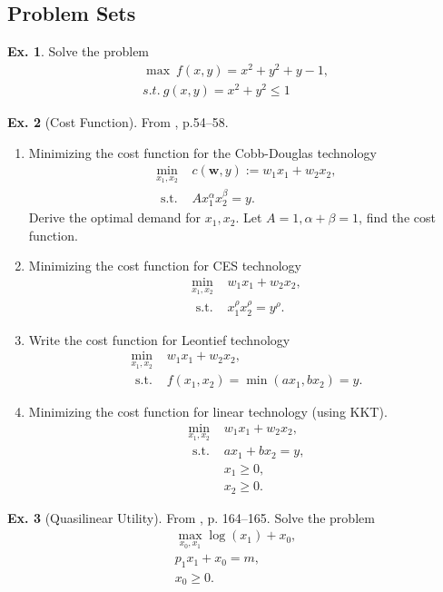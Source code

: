 \documentclass[11pt,a4paper]{book}
\theoremstyle{definition}\newtheorem{definition}{Definition}
\theoremstyle{definition}\newtheorem{fact}{Fact}
\theoremstyle{definition}\newtheorem{remark}{Remark}
\theoremstyle{definition}\newtheorem{ex}{Ex.}
\theoremstyle{definition}\newtheorem{project}{Project}
\theoremstyle{definition}\newtheorem{problem}{Problem}
\theoremstyle{definition}\newtheorem{example}{Example}
\numberwithin{theorem}{section}
\numberwithin{corollary}{chapter}
\numberwithin{assumption}{chapter}
\numberwithin{definition}{chapter}
\numberwithin{prop}{chapter}
\numberwithin{notation}{chapter}
\numberwithin{problem}{chapter}
\numberwithin{example}{chapter}
\numberwithin{fact}{chapter}
\numberwithin{ex}{chapter}
\def\w{\mathbf w}
\begin{document}
	\subsection{Problem Sets}
	\begin{ex}
		Solve the problem
		\begin{align*}
			&\max  \  f(x,y) = x^2 + y^2 + y - 1, \\
			&s.t. \ g(x,y) = x^2 + y^2 \leq 1 &                             
		\end{align*}
	\end{ex}
	
		\begin{ex}[Cost Function]
		From \citet{varian1992microeconomic}, p.54--58. 
		\begin{enumerate}
			\item Minimizing the cost function for the Cobb-Douglas technology
			\begin{align*}
				\min_{x_1, x_2} &c(\w, y):= w_1 x_1 + w_2 x_2, \\
				\text{ s.t. } &A x_1^\alpha x_2^\beta = y.
			\end{align*}
			Derive the optimal demand for $x_1, x_2$. Let $A=1, \alpha+\beta=1$, find the cost function.
			\item Minimizing the cost function for CES technology
			\begin{align*}
				\min_{x_1, x_2} & w_1 x_1 + w_2 x_2, \\
				\text{ s.t. } & x_1^\rho x_2^\rho = y^\rho.
			\end{align*}
			\item Write the cost function for Leontief technology
			\begin{align*}
				\min_{x_1, x_2} & w_1 x_1 + w_2 x_2, \\
				\text{ s.t. } & f(x_1,x_2) = \min (ax_1, bx_2) = y.
			\end{align*}
			\item Minimizing the cost function for linear technology (using KKT). 
			\begin{align*}
				\min_{x_1, x_2} & w_1 x_1 + w_2 x_2, \\
				\text{ s.t. } & a x_1 + b x_2 = y, \\
				& x_1 \geq 0, \\
				& x_2 \geq 0.
			\end{align*}
		\end{enumerate} 
	\end{ex}
	
	\begin{ex}[Quasilinear Utility]
		From \citet{varian1992microeconomic}, p. 164--165. Solve the problem
		\begin{align*}
			\max_{x_0, x_1} \log(x_1) + x_0, \\
			p_1 x_1 + x_0 = m, \\
			x_0 \geq 0.
		\end{align*}
	\end{ex}
	
\end{document}
